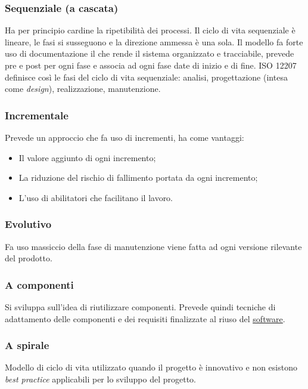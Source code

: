 		\subsubsection{Sequenziale (a cascata)}
			Ha per principio cardine la ripetibilità dei processi.
			Il ciclo di vita sequenziale è lineare, le fasi si susseguono e la direzione ammessa è una sola.
			Il modello fa forte uso di documentazione il che rende il sistema organizzato e tracciabile, prevede pre e post per ogni fase e associa ad ogni fase date di inizio e di fine.
ISO 12207 definisce così le fasi del ciclo di vita sequenziale: analisi, progettazione (intesa come \textit{design}), realizzazione, manutenzione.


		\subsubsection{Incrementale}
			Prevede un approccio che fa uso di incrementi, ha come vantaggi:
			\begin{itemize}
			\item Il valore aggiunto di ogni incremento;
			\item La riduzione del rischio di fallimento portata da ogni incremento;
			\item L'uso di abilitatori che facilitano il lavoro.
			\end{itemize}


		\subsubsection{Evolutivo}
			Fa uso massiccio della fase di manutenzione viene fatta ad ogni versione rilevante del prodotto.


		\subsubsection{A componenti}
			Si sviluppa sull'idea di riutilizzare componenti. Prevede quindi tecniche di adattamento delle componenti e dei requisiti finalizzate al riuso del \underline{\hyperref[sec:prodottosoftware]{software}}.


		\subsubsection{A spirale}
				Modello di ciclo di vita utilizzato quando il progetto è innovativo e non esistono \emph{best practice} applicabili per lo sviluppo del progetto.


